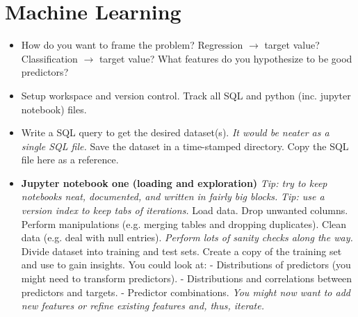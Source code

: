 \section{Machine Learning}

\begin{itemize}
\item
How do you want to frame the problem?\newline
Regression $\rightarrow$ target value?
Classification $\rightarrow$ target value?\newline
What features do you hypothesize to be good predictors?

\item
Setup workspace and version control.\newline
Track all SQL and python (inc. jupyter notebook) files.

\item
Write a SQL query to get the desired dataset(s).
\textit{It would be neater as a single SQL file.}\newline
Save the dataset in a time-stamped directory.
Copy the SQL file here as a reference.

\item
\textbf{Jupyter notebook one (loading and exploration)}\newline
\textit{Tip: try to keep notebooks neat, documented, and written in fairly big blocks.}\newline
\textit{Tip: use a version index to keep tabs of iterations.}\newline
Load data.\newline
Drop unwanted columns.\newline
Perform manipulations (e.g. merging tables and dropping duplicates).\newline
Clean data (e.g. deal with null entries).\newline
\textit{Perform lots of sanity checks along the way.}\newline
\newline
Divide dataset into training and test sets.\newline
Create a copy of the training set and use to gain insights. You could look at:\newline
- Distributions of predictors (you might need to transform predictors).\newline
- Distributions and correlations between predictors and targets.\newline
- Predictor combinations.\newline
\textit{You might now want to add new features or refine existing features and, thus, iterate.}


\end{itemize}
